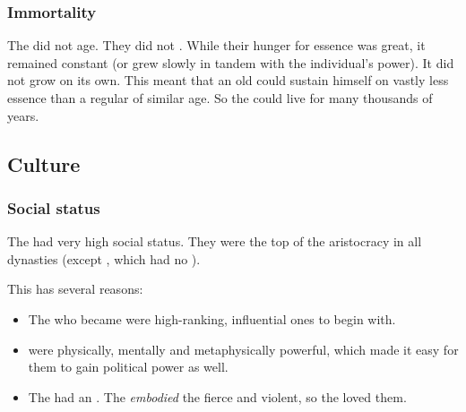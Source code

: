 \subsubsection{Immortality}
The \satharioth did not age. 
They did not .
While their hunger for essence was great, it remained constant (or grew slowly in tandem with the individual's power).
It did not grow on its own. 
This meant that an old \sathariah could sustain himself on vastly less essence than a regular \resphan of similar age. 
So the \satharioth could live for many thousands of years. 









\subsection{Culture}





\subsubsection{Social status}
The \satharioth had very high social status. 
They were the top of the \resphan aristocracy in all dynasties (except \Baelzerach, which had no \satharioth). 

This has several reasons:
\begin{itemize}
  \item 
    The \resphain who became \satharioth were high-ranking, influential ones to begin with.
  \item 
    \Satharioth were physically, mentally and metaphysically powerful, which made it easy for them to gain political power as well.
  \item 
    The \resphain had an . 
    The \satharioth \emph{embodied} the fierce and violent, so the \resphain loved them. 
\end{itemize}












